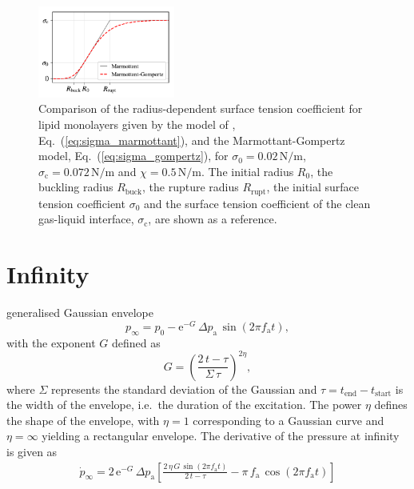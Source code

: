 \begin{figure}
\centerline{\includegraphics[width=0.4\textwidth]{figures/gompertz}}
\caption{Comparison of the radius-dependent surface tension coefficient for lipid monolayers given by the model of \citet{Marmottant2005}, Eq.~(\ref{eq:sigma_marmottant}), and the Marmottant-Gompertz model, Eq.~(\ref{eq:sigma_gompertz}), for $\sigma_0= 0.02 \, \text{N/m}$, $\sigma_\text{c} = 0.072 \, \text{N/m}$ and $\chi = 0.5 \, \text{N/m}$. The initial radius $R_0$, the buckling radius $R_\text{buck}$, the rupture radius $R_\text{rupt}$, the initial surface tension coefficient $\sigma_0$ and the surface tension coefficient of the clean gas-liquid interface, $\sigma_\text{c}$, are shown as a reference.}
\label{fig:gompertz}
\end{figure}


\section{Infinity}
\label{sec:infinity}

generalised Gaussian envelope
\begin{equation}
p_\infty = p_0 - \text{e}^{-G} \,  \Delta p_\text{a} \, \sin(2 \pi f_\text{a} t),
\end{equation}
with the exponent $G$ defined as
\begin{equation}
G = \left( \frac{ 2\, t - \tau}{\Sigma \, \tau }  \right)^{2\eta},
\end{equation}
where $\Sigma$ represents the standard deviation of the Gaussian and $\tau = t_\text{end}-t_\text{start}$ is the width of the envelope, i.e.~the duration of the excitation. The power $\eta$ defines the shape of the envelope, with $\eta=1$ corresponding to a Gaussian curve and $\eta=\infty$ yielding a rectangular envelope.
The derivative of the pressure at infinity is given as
\begin{align}
\dot{p}_\infty = 2 \, \text{e}^{-G} \, \Delta p_\text{a} \left[ \frac{2\, \eta  \, G \, \sin(2 \pi f_\text{a} t)}{2\, t-\tau} - \pi \, f_\text{a} \, \cos (2\pi f_\text{a} t) \right]
\end{align}

